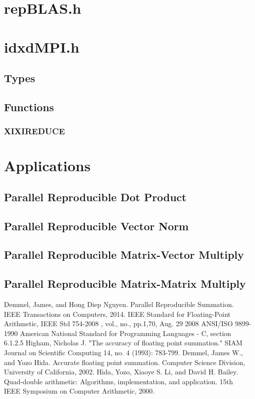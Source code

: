 \documentclass[12pt]{article}
\theoremstyle{plain}
\numberwithin{equation}{section}
\begin{document}
\section{repBLAS.h}
\section{idxdMPI.h}
  \subsection{Types}
  \subsection{Functions}
    \subsubsection{XIXIREDUCE}
\section{Applications}
  \subsection{Parallel Reproducible Dot Product}
  \subsection{Parallel Reproducible Vector Norm}
  \subsection{Parallel Reproducible Matrix-Vector Multiply}
  \subsection{Parallel Reproducible Matrix-Matrix Multiply}
\begin{thebibliography}{9}
    Demmel, James, and Hong Diep Nguyen. Parallel Reproducible Summation. IEEE Transactions on Computers, 2014.
    IEEE Standard for Floating-Point Arithmetic, IEEE Std 754-2008 , vol., no., pp.1,70, Aug. 29 2008
    ANSI/ISO 9899-1990 American National Standard for Programming Languages - C, section 6.1.2.5
    Higham, Nicholas J. "The accuracy of floating point summation." SIAM Journal on Scientific Computing 14, no. 4 (1993): 783-799.
    Demmel, James W., and Yozo Hida. Accurate floating point summation. Computer Science Division, University of California, 2002.
    Hida, Yozo, Xiaoye S. Li, and David H. Bailey. Quad-double arithmetic: Algorithms, implementation, and application. 15th IEEE Symposium on Computer Arithmetic, 2000.
\end{thebibliography}
\end{document}
